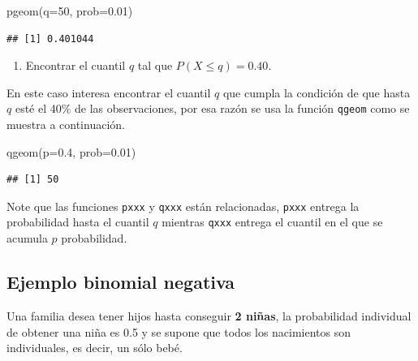 \documentclass[
]{book}
\makeatletter
\newenvironment{Shaded}{\begin{snugshade}}{\end{snugshade}}
\newcommand{\AttributeTok}[1]{\textcolor[rgb]{0.77,0.63,0.00}{#1}}
\newcommand{\DecValTok}[1]{\textcolor[rgb]{0.00,0.00,0.81}{#1}}
\newcommand{\FloatTok}[1]{\textcolor[rgb]{0.00,0.00,0.81}{#1}}
\newcommand{\FunctionTok}[1]{\textcolor[rgb]{0.00,0.00,0.00}{#1}}
\newcommand{\NormalTok}[1]{#1}
\providecommand{\tightlist}{%
  \setlength{\itemsep}{0pt}\setlength{\parskip}{0pt}}
\newenvironment{kframe}{%
\medskip{}
\setlength{\fboxsep}{.8em}
 \def\at@end@of@kframe{}%
 \ifinner\ifhmode%
  \def\at@end@of@kframe{\end{minipage}}%
  \begin{minipage}{\columnwidth}%
 \fi\fi%
 \def\FrameCommand##1{\hskip\@totalleftmargin \hskip-\fboxsep
 \colorbox{shadecolor}{##1}\hskip-\fboxsep
     \hskip-\linewidth \hskip-\@totalleftmargin \hskip\columnwidth}%
 \MakeFramed {\advance\hsize-\width
   \@totalleftmargin\z@ \linewidth\hsize
   \@setminipage}}%
 {\par\unskip\endMakeFramed%
 \at@end@of@kframe}
\renewenvironment{Shaded}{\begin{kframe}}{\end{kframe}}
\newenvironment{rmdblock}[1]
  {
  \begin{itemize}
  \renewcommand{\labelitemi}{
    \raisebox{-.7\height}[0pt][0pt]{
      {\setkeys{Gin}{width=3em,keepaspectratio}\texttt{[image: images/\#1]}}
    }
  }
  \setlength{\fboxsep}{1em}
  \begin{kframe}
  \item
  }
  {
  \end{kframe}
  \end{itemize}
  }
\newenvironment{rmdnote}
  {\begin{rmdblock}{note}}
  {\end{rmdblock}}
\makeatother
\begin{document}
\begin{Shaded}
\begin{Highlighting}[]
\FunctionTok{pgeom}\NormalTok{(}\AttributeTok{q=}\DecValTok{50}\NormalTok{, }\AttributeTok{prob=}\FloatTok{0.01}\NormalTok{)}
\end{Highlighting}
\end{Shaded}

\begin{verbatim}
## [1] 0.401044
\end{verbatim}

\begin{enumerate}
\def\labelenumi{\arabic{enumi})}
\setcounter{enumi}{2}
\tightlist
\item
  Encontrar el cuantil \(q\) tal que \(P(X \leq q) = 0.40\).
\end{enumerate}

En este caso interesa encontrar el cuantil \(q\) que cumpla la condición de que hasta \(q\) esté el 40\% de las observaciones, por esa razón se usa la función \texttt{qgeom} como se muestra a continuación.

\begin{Shaded}
\begin{Highlighting}[]
\FunctionTok{qgeom}\NormalTok{(}\AttributeTok{p=}\FloatTok{0.4}\NormalTok{, }\AttributeTok{prob=}\FloatTok{0.01}\NormalTok{)}
\end{Highlighting}
\end{Shaded}

\begin{verbatim}
## [1] 50
\end{verbatim}

\begin{rmdnote}
Note que las funciones \texttt{pxxx} y \texttt{qxxx} están relacionadas, \texttt{pxxx} entrega la probabilidad hasta el cuantil \(q\) mientras \texttt{qxxx} entrega el cuantil en el que se acumula \(p\) probabilidad.
\end{rmdnote}

\hypertarget{ejemplo-binomial-negativa}{%
\subsection*{Ejemplo binomial negativa}\label{ejemplo-binomial-negativa}}

Una familia desea tener hijos hasta conseguir \textbf{2 niñas}, la probabilidad individual de obtener una niña es 0.5 y se supone que todos los nacimientos son individuales, es decir, un sólo bebé.
\end{document}
